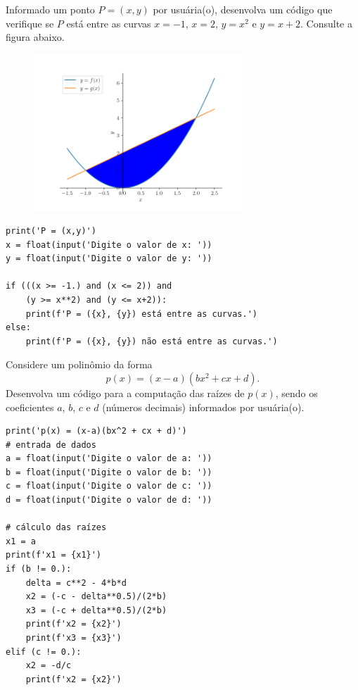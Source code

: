 \begin{exer}\label{cap_progest_sec_ramifica:exer:entre_curvas}
  Informado um ponto $P = (x, y)$ por usuária(o), desenvolva um código que verifique se $P$ está entre as curvas $x = -1$, $x = 2$, $y = x^2$ e $y = x+2$. Consulte a figura abaixo.
\begin{figure}[H]
  \centering
  \includegraphics[width=0.7\textwidth]{./cap_progest/dados/fig_exer_entre_curvas/fig}
\end{figure}
\end{exer}
\begin{resp}

\begin{lstlisting}
print('P = (x,y)')
x = float(input('Digite o valor de x: '))
y = float(input('Digite o valor de y: '))

if (((x >= -1.) and (x <= 2)) and
    (y >= x**2) and (y <= x+2)):
    print(f'P = ({x}, {y}) está entre as curvas.')
else:
    print(f'P = ({x}, {y}) não está entre as curvas.')
\end{lstlisting}

\end{resp}

\begin{exer}
  Considere um polinômio da forma
  \begin{equation}
    p(x) = (x-a)(bx^2 + cx + d).
  \end{equation}
  Desenvolva um código para a computação das raízes de $p(x)$, sendo os coeficientes $a$, $b$, $c$ e $d$ (números decimais) informados por usuária(o).
\end{exer}
\begin{resp}

\begin{lstlisting}
print('p(x) = (x-a)(bx^2 + cx + d)')
# entrada de dados
a = float(input('Digite o valor de a: '))
b = float(input('Digite o valor de b: '))
c = float(input('Digite o valor de c: '))
d = float(input('Digite o valor de d: '))

# cálculo das raízes
x1 = a
print(f'x1 = {x1}')
if (b != 0.):
    delta = c**2 - 4*b*d
    x2 = (-c - delta**0.5)/(2*b)
    x3 = (-c + delta**0.5)/(2*b)
    print(f'x2 = {x2}')
    print(f'x3 = {x3}')
elif (c != 0.):
    x2 = -d/c
    print(f'x2 = {x2}')
\end{lstlisting}

\end{resp}

